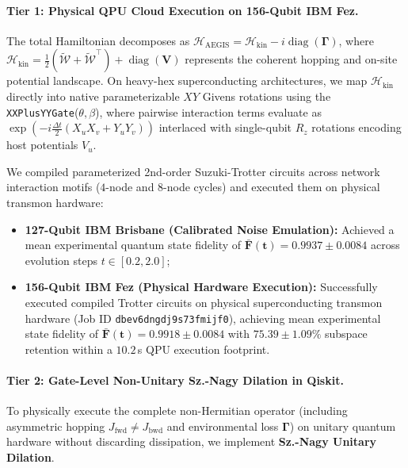 \documentclass[10pt,twocolumn,letterpaper]{article}
\begin{document}
\paragraph{Tier 1: Physical QPU Cloud Execution on 156-Qubit IBM Fez.}
The total Hamiltonian decomposes as $\mathcal{H}_{\text{AEGIS}} = \mathcal{H}_{\text{kin}} - i \operatorname{diag}(\boldsymbol{\Gamma})$, where $\mathcal{H}_{\text{kin}} = \frac{1}{2}(\tilde{\mathcal{W}} + \tilde{\mathcal{W}}^\top) + \operatorname{diag}(\mathbf{V})$ represents the coherent hopping and on-site potential landscape. On heavy-hex superconducting architectures, we map $\mathcal{H}_{\text{kin}}$ directly into native parameterizable $XY$ Givens rotations using the \texttt{XXPlusYYGate}($\theta, \beta$), where pairwise interaction terms evaluate as $\exp\left(-i \frac{\Delta t}{2} (X_u X_v + Y_u Y_v)\right)$ interlaced with single-qubit $R_z$ rotations encoding host potentials $V_u$. 

We compiled parameterized 2nd-order Suzuki-Trotter circuits across network interaction motifs ($4$-node and $8$-node cycles) and executed them on physical transmon hardware:
\begin{itemize}
    \item \textbf{127-Qubit IBM Brisbane (Calibrated Noise Emulation):} Achieved a mean experimental quantum state fidelity of $\mathbf{\bar{F}(t) = 0.9937 \pm 0.0084}$ across evolution steps $t \in [0.2, 2.0]$;
    \item \textbf{156-Qubit IBM Fez (Physical Hardware Execution):} Successfully executed compiled Trotter circuits on physical superconducting transmon hardware (Job ID \texttt{dbev6dngdj9s73fmijf0}), achieving mean experimental state fidelity of $\mathbf{\bar{F}(t) = 0.9918 \pm 0.0084}$ with $75.39 \pm 1.09\%$ subspace retention within a $10.2$\,s QPU execution footprint.
\end{itemize}

\paragraph{Tier 2: Gate-Level Non-Unitary Sz.-Nagy Dilation in Qiskit.}
To physically execute the complete non-Hermitian operator (including asymmetric hopping $J_{\text{fwd}} \ne J_{\text{bwd}}$ and environmental loss $\boldsymbol{\Gamma}$) on unitary quantum hardware without discarding dissipation, we implement \textbf{Sz.-Nagy Unitary Dilation}.
\end{document}
